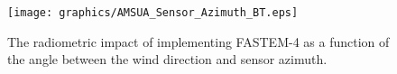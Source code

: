 \begin{figure}[htp]
  \centering
  \texttt{[image: graphics/AMSUA\_Sensor\_Azimuth\_BT.eps]}
  \caption{The radiometric impact of implementing FASTEM-4 as a function of the angle between the wind direction and sensor azimuth.}
  \label{fig:AMSUA_Sensor_Azimuth_Impact}
\end{figure} 

%
%



